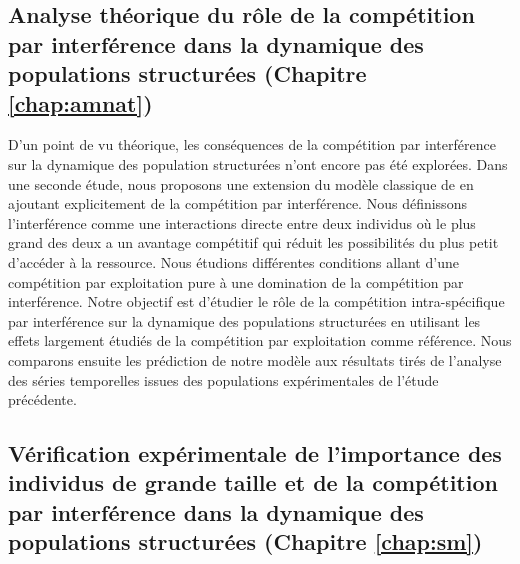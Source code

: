 \subsection{Analyse théorique du rôle de la compétition par interférence dans
la dynamique des populations structurées (Chapitre \ref{chap:amnat})}

D'un point de vu théorique, les conséquences de la compétition par interférence
sur la dynamique des population structurées n'ont encore pas été explorées. Dans
une seconde étude, nous proposons une extension du modèle classique de
\textcites{kooijman1984a} en ajoutant explicitement de la compétition par
interférence. Nous définissons l'interférence comme une interactions directe
entre deux individus où le plus grand des deux a un avantage compétitif qui
réduit les possibilités du plus petit d'accéder à la ressource. Nous étudions
différentes conditions allant d'une compétition par exploitation pure à une
domination de la compétition par interférence. Notre objectif est d'étudier le
rôle de la compétition intra-spécifique par interférence sur la dynamique des
populations structurées en utilisant les effets largement étudiés de la
compétition par exploitation comme référence. Nous comparons ensuite les
prédiction de notre modèle aux résultats tirés de l'analyse des séries
temporelles issues des populations expérimentales de l'étude précédente.

\subsection{Vérification expérimentale de l'importance des individus de
grande taille et de la compétition par interférence dans la dynamique des
populations structurées (Chapitre \ref{chap:sm})}

